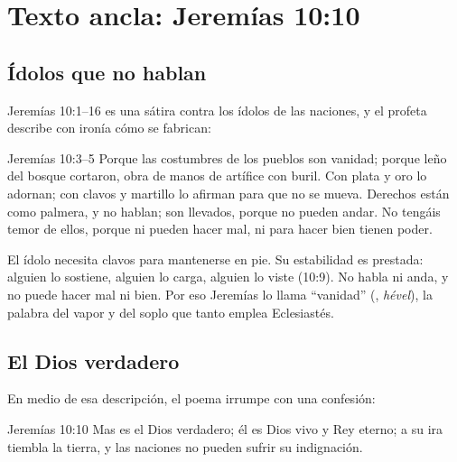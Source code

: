 \section{Texto ancla: Jeremías 10:10}\label{sec:jer10}

\subsection{Ídolos que no hablan}
Jeremías 10:1--16 es una sátira contra los ídolos de las naciones, y el profeta describe con ironía cómo se fabrican:

\begin{verso}{Jeremías 10:3–5}
Porque las costumbres de los pueblos son vanidad; porque leño del bosque cortaron, obra de manos de artífice con buril. Con plata y oro lo adornan; con clavos y martillo lo afirman para que no se mueva. Derechos están como palmera, y no hablan; son llevados, porque no pueden andar. No tengáis temor de ellos, porque ni pueden hacer mal, ni para hacer bien tienen poder.
\end{verso}

El ídolo necesita clavos para mantenerse en pie. Su estabilidad es prestada: alguien lo sostiene, alguien lo carga, alguien lo viste (10:9). No habla ni anda, y no puede hacer mal ni bien. Por eso Jeremías lo llama ``vanidad'' (, \emph{hével}), la palabra del vapor y del soplo que tanto emplea Eclesiastés.


\subsection{El Dios verdadero}
En medio de esa descripción, el poema irrumpe con una confesión:

\begin{verso}{Jeremías 10:10}
Mas \SENOR{} es el Dios verdadero; él es Dios vivo y Rey eterno; a su ira tiembla la tierra, y las naciones no pueden sufrir su indignación.
\end{verso}

